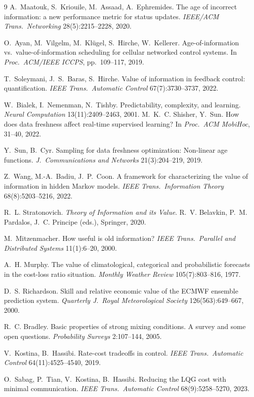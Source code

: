 \documentclass[11pt]{article}
\begin{document}
\begin{thebibliography}{9}
A.~Maatouk, S.~Kriouile, M.~Assaad, A.~Ephremides. The age of incorrect
information: a new performance metric for status updates.
\emph{IEEE/ACM Trans.\ Networking} 28(5):2215--2228, 2020.

O.~Ayan, M.~Vilgelm, M.~Kl\"ugel, S.~Hirche, W.~Kellerer.
Age-of-information vs.\ value-of-information scheduling for cellular
networked control systems. In \emph{Proc.\ ACM/IEEE ICCPS}, pp.~109--117, 2019.

T.~Soleymani, J.~S.~Baras, S.~Hirche. Value of information in
feedback control: quantification.
\emph{IEEE Trans.\ Automatic Control} 67(7):3730--3737, 2022.

W.~Bialek, I.~Nemenman, N.~Tishby. Predictability, complexity, and
learning. \emph{Neural Computation} 13(11):2409--2463, 2001.
M.~K.~C. Shisher, Y.~Sun. How does data freshness affect real-time
supervised learning? In \emph{Proc.\ ACM MobiHoc}, 31--40, 2022.

Y.~Sun, B.~Cyr. Sampling for data freshness optimization: Non-linear age
functions. \emph{J.\ Communications and Networks} 21(3):204--219, 2019.

Z.~Wang, M.-A.~Badiu, J.~P.~Coon. A framework for characterizing the
value of information in hidden Markov models. \emph{IEEE Trans.\
Information Theory} 68(8):5203--5216, 2022.

R.~L. Stratonovich. \emph{Theory of Information and its Value}.
R.~V. Belavkin, P.~M. Pardalos, J.~C. Principe (eds.), Springer, 2020.

M.~Mitzenmacher. How useful is old information? \emph{IEEE Trans.\
Parallel and Distributed Systems} 11(1):6--20, 2000.

A.~H. Murphy. The value of climatological, categorical and probabilistic
forecasts in the cost-loss ratio situation. \emph{Monthly Weather Review}
105(7):803--816, 1977.

D.~S. Richardson. Skill and relative economic value of the ECMWF ensemble
prediction system. \emph{Quarterly J.\ Royal Meteorological Society}
126(563):649--667, 2000.

R.~C. Bradley. Basic properties of strong mixing conditions. A survey and
some open questions. \emph{Probability Surveys} 2:107--144, 2005.

\bibitem{kostinahassibi19}
V.~Kostina, B.~Hassibi. Rate-cost tradeoffs in control. \emph{IEEE Trans.\
Automatic Control} 64(11):4525--4540, 2019.

\bibitem{sabag23}
O.~Sabag, P.~Tian, V.~Kostina, B.~Hassibi. Reducing the LQG cost with
minimal communication. \emph{IEEE Trans.\ Automatic Control}
68(9):5258--5270, 2023.

\end{thebibliography}
\end{document}
